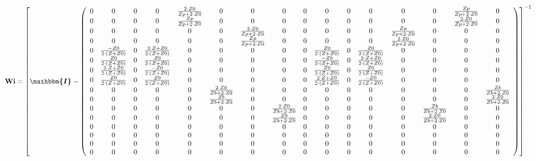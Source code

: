 \[ \mathbf{Wi} =  \left[ \boldsymbol{\mathbbm{I}}  -
\left(\begin{array}{cccccccccccccccc} 0 & 0 & 0 & 0 & \frac{2\cdot
Z0}{Zp+2\cdot Z0} & 0 & 0 & 0 & 0 & 0 & 0 & 0 & 0 & 0 &
\frac{Zp}{Zp+2\cdot Z0} & 0 \\ 0 & 0 & 0 & 0 & \frac{Zp}{Zp+2\cdot Z0}
& 0 & 0 & 0 & 0 & 0 & 0 & 0 & 0 & 0 & \frac{2\cdot Z0}{Zp+2\cdot Z0} &
0 \\ 0 & 0 & 0 & 0 & 0 & 0 & \frac{2\cdot Z0}{Zp+2\cdot Z0} & 0 & 0 &
0 & 0 & 0 & \frac{Zp}{Zp+2\cdot Z0} & 0 & 0 & 0 \\ 0 & 0 & 0 & 0 & 0 &
0 & \frac{Zp}{Zp+2\cdot Z0} & 0 & 0 & 0 & 0 & 0 & \frac{2\cdot
Z0}{Zp+2\cdot Z0} & 0 & 0 & 0 \\ 0 & \frac{-Z0}{2\cdot  (Z+Z0 )} & 0 &
\frac{2\cdot Z+Z0}{2\cdot  (Z+Z0 )} & 0 & 0 & 0 & 0 & 0 &
\frac{Z0}{2\cdot  (Z+Z0 )} & 0 & \frac{Z0}{2\cdot  (Z+Z0 )} & 0 & 0 &
0 & 0 \\ 0 & \frac{Z0}{2\cdot  (Z+Z0 )} & 0 & \frac{Z0}{2\cdot  (Z+Z0
)} & 0 & 0 & 0 & 0 & 0 & \frac{-Z0}{2\cdot  (Z+Z0 )} & 0 &
\frac{2\cdot Z+Z0}{2\cdot  (Z+Z0 )} & 0 & 0 & 0 & 0 \\ 0 &
\frac{2\cdot Z+Z0}{2\cdot  (Z+Z0 )} & 0 & \frac{-Z0}{2\cdot  (Z+Z0 )}
& 0 & 0 & 0 & 0 & 0 & \frac{Z0}{2\cdot  (Z+Z0 )} & 0 &
\frac{Z0}{2\cdot  (Z+Z0 )} & 0 & 0 & 0 & 0 \\ 0 & \frac{Z0}{2\cdot
(Z+Z0 )} & 0 & \frac{Z0}{2\cdot  (Z+Z0 )} & 0 & 0 & 0 & 0 & 0 &
\frac{2\cdot Z+Z0}{2\cdot  (Z+Z0 )} & 0 & \frac{-Z0}{2\cdot  (Z+Z0 )}
& 0 & 0 & 0 & 0 \\ 0 & 0 & 0 & 0 & 0 & \frac{2\cdot Z0}{Zb+2\cdot Z0}
& 0 & 0 & 0 & 0 & 0 & 0 & 0 & 0 & 0 & \frac{Zb}{Zb+2\cdot Z0} \\ 0 & 0
& 0 & 0 & 0 & \frac{Zb}{Zb+2\cdot Z0} & 0 & 0 & 0 & 0 & 0 & 0 & 0 & 0
& 0 & \frac{2\cdot Z0}{Zb+2\cdot Z0} \\ 0 & 0 & 0 & 0 & 0 & 0 & 0 &
\frac{2\cdot Z0}{Zb+2\cdot Z0} & 0 & 0 & 0 & 0 & 0 &
\frac{Zb}{Zb+2\cdot Z0} & 0 & 0 \\ 0 & 0 & 0 & 0 & 0 & 0 & 0 &
\frac{Zb}{Zb+2\cdot Z0} & 0 & 0 & 0 & 0 & 0 & \frac{2\cdot
Z0}{Zb+2\cdot Z0} & 0 & 0 \\ 0 & 0 & 0 & 0 & 0 & 0 & 0 & 0 & 0 & 0 & 0
& 0 & 0 & 0 & 0 & 0 \\ 0 & 0 & 0 & 0 & 0 & 0 & 0 & 0 & 0 & 0 & 0 & 0 &
0 & 0 & 0 & 0 \\ 0 & 0 & 0 & 0 & 0 & 0 & 0 & 0 & 0 & 0 & 0 & 0 & 0 & 0
& 0 & 0 \\ 0 & 0 & 0 & 0 & 0 & 0 & 0 & 0 & 0 & 0 & 0 & 0 & 0 & 0 & 0 &
0 \end{array}\right) \right]^{-1}  \]
